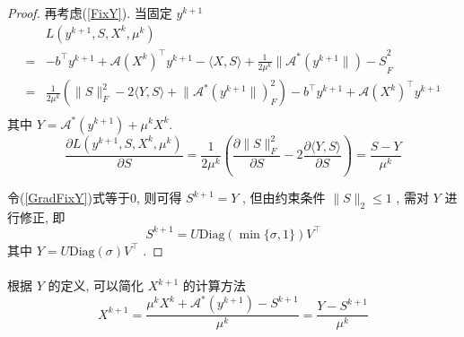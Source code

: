 \documentclass[a4paper, UTF8]{ctexart}				%
\numberwithin{equation}{section}				%
\begin{document}
\begin{proof}
				\quad 再考虑(\ref{FixY}). 当固定 $y^{k + 1}$
				\begin{equation}
					\begin{split}\label{LagFixY}
							& L(y^{k + 1},S,X^k,\mu^k)\\
						=	& -b^\top y^{k + 1} + \mathcal{A}(X^k)^\top y^{k + 1} - \langle{X, S}\rangle + \frac{1}{2\mu^k} \lVert{\mathcal{A}^*(y^{k + 1}\rVert) - S}^2_F\\
						=	& \frac{1}{2\mu^k}(\lVert{S}\rVert_F^2 - 2\langle{Y, S}\rangle + \lVert{\mathcal{A}^*(y^{k + 1}\rVert)}_F^2) - b^\top y^{k + 1} + \mathcal{A}(X^k)^\top y^{k + 1}\\
					\end{split}
				\end{equation}
				其中 $Y = \mathcal{A}^*(y^{k + 1}) + \mu^k X^k$.
				\begin{equation}\label{GradFixY}
						\frac{\partial L(y^{k + 1},S,X^k,\mu^k)}{\partial S}
					=	\frac{1}{2\mu^k}(\frac{\partial \lVert{S}\rVert_F^2}{\partial S} - 2 \frac{\partial \langle{Y, S}\rangle}{\partial S})
					=	\frac{S - Y}{\mu^k}
				\end{equation}

				\quad 令(\ref{GradFixY})式等于0, 则可得 $S^{k + 1} = Y$ , 但由约束条件 $\lVert{S}\rVert_2 \leq 1$ , 需对 $Y$ 进行修正, 即
				\begin{equation}
					S^{k + 1} = U \text{Diag}(\min \{\sigma, 1\}) V^\top
				\end{equation}
				其中 $Y = U \text{Diag}(\sigma) V^\top$ .
			\end{proof}

			\paragraph{}
				\quad 根据 $Y$ 的定义, 可以简化 $X^{k + 1}$ 的计算方法
				\begin{equation}\label{dualAX}
						X^{k + 1}
					=	\frac{\mu^kX^k + \mathcal{A}^*(y^{k + 1})-S^{k + 1}}{\mu^k}
					=	\frac{Y - S^{k + 1}}{\mu^k}
				\end{equation}
\end{document}
